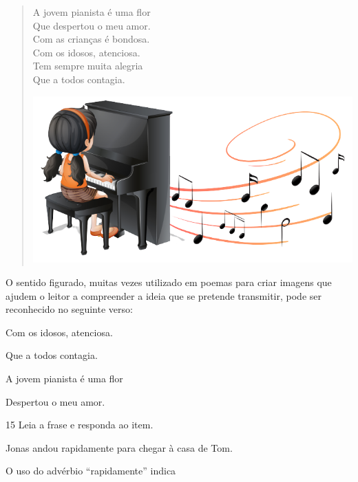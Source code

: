 \begin{myquote}
\begin{verse}
A jovem pianista é uma flor\\
Que despertou o meu amor.\\
Com as crianças é bondosa.\\
Com os idosos, atenciosa.\\
Tem sempre muita alegria\\
Que a todos contagia.\\

\begin{center}
\includegraphics[width=.7\textwidth]{./media/image23i.png}
\end{center}

\end{verse}
\end{myquote}

O sentido figurado, muitas vezes utilizado em poemas para criar imagens
que ajudem o leitor a compreender a ideia que se pretende transmitir,
pode ser reconhecido no seguinte verso:

\begin{escolha}
\item Com os idosos, atenciosa.

\item Que a todos contagia.

\item A jovem pianista é uma flor

\item Despertou o meu amor.
\end{escolha}

\pagebreak
\num{15} Leia a frase e responda ao item.

\begin{myquote}
Jonas andou rapidamente para chegar à casa de Tom.
\end{myquote}

O uso do advérbio ``rapidamente'' indica 

